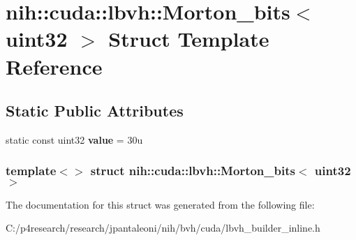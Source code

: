 \hypertarget{structnih_1_1cuda_1_1lbvh_1_1_morton__bits_3_01uint32_01_4}{
\section{nih\-:\-:cuda\-:\-:lbvh\-:\-:\-Morton\-\_\-bits$<$ uint32 $>$ \-Struct \-Template \-Reference}
\label{structnih_1_1cuda_1_1lbvh_1_1_morton__bits_3_01uint32_01_4}
}
\subsection*{\-Static \-Public \-Attributes}
\begin{DoxyCompactItemize}
\item 
\hypertarget{structnih_1_1cuda_1_1lbvh_1_1_morton__bits_3_01uint32_01_4_a21e41e687404ac655d244e3303e77170}{
static const uint32 {\bfseries value} = 30u}
\label{structnih_1_1cuda_1_1lbvh_1_1_morton__bits_3_01uint32_01_4_a21e41e687404ac655d244e3303e77170}

\end{DoxyCompactItemize}
\subsubsection*{template$<$$>$ struct nih\-::cuda\-::lbvh\-::\-Morton\-\_\-bits$<$ uint32 $>$}



\-The documentation for this struct was generated from the following file\-:\begin{DoxyCompactItemize}
\item 
\-C\-:/p4research/research/jpantaleoni/nih/bvh/cuda/lbvh\-\_\-builder\-\_\-inline.\-h\end{DoxyCompactItemize}
